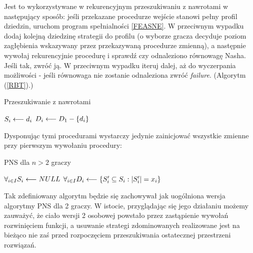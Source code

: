 \documentclass[polish]{standalone}
\begin{document}
Jest to wykorzystywane w rekurencyjnym przeszukiwaniu z nawrotami w następujący sposób: jeśli przekazane procedurze
wejście stanowi pełny profil dziedzin, uruchom program spełnialności \ref{FEASNE}. W przeciwnym wypadku dodaj kolejną
dziedzinę strategii do profilu (o wyborze gracza decyduje poziom zagłębienia wskazywany przez przekazywaną procedurze
zmienną), a następnie wywołaj rekurencyjnie procedurę i sprawdź czy odnaleziono równowagę Nasha. Jeśli tak, zwróć ją.
W przeciwnym wypadku iteruj dalej, aż do wyczerpania możliwości - jeśli równowaga nie zostanie odnaleziona zwróć
\textit{failure}. (Algorytm (\ref{RBT}).)

\begin{algorithm}
\caption{Przeszukiwanie z nawrotami}
\label{RBT}
\begin{algorithmic}
 \ELSE
 \ENDIF
\ELSE
  \STATE $S_i \longleftarrow d_i$
  \STATE $D_i \longleftarrow D_1 - \{ d_i \}$
  \ENDIF
 \ENDFOR 
\ENDIF
\end{algorithmic}
\end{algorithm}

Dysponując tymi procedurami wystarczy jedynie zainicjować wszystkie zmienne przy pierwszym wywołaniu procedury:

\begin{algorithm}
\caption{PNS dla $n > 2$ graczy}
\label{PNSN}
\begin{algorithmic}
 \STATE $\forall_{i \in I} S_i \longleftarrow NULL$
 \STATE $\forall_{i \in I} D_i \longleftarrow \{ S_i' \subseteq S_i : |S_i'| = x_i \}$
 \ENDIF
\ENDFOR
\end{algorithmic}
\end{algorithm}

Tak zdefiniowany algorytm będzie się zachowywał jak uogólniona wersja algorytmy PNS dla 2 graczy. W istocie,
przyglądając się jego działaniu możemy zauważyć, że ciało wersji 2 osobowej powstało przez zastąpienie wywołań
rozwinięciem funkcji, a usuwanie strategi zdominowanych realizowane jest na bieżąco nie zaś przed rozpoczęciem
przeszukiwania ostatecznej przestrzeni rozwiązań. 
\end{document}
